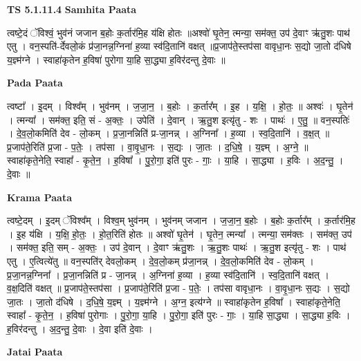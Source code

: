 \documentclass[17pt]{extarticle}
\begin{document}
\textbf{TS 5.1.11.4 } \newline
\textbf{Samhita Paata} \newline

त्वष्टे॒दं ॅविश्वं॒ भुव॑नं जजान ब॒होः क॒र्तार॑मि॒ह य॑क्षि होतः ॥अश्वो॑ घृ॒तेन॒ त्मन्या॒ सम॑क्त॒ उप॑ दे॒वाꣳ ऋ॑तु॒शः पाथ॑ एतु । वन॒स्पति॑-र्देवलो॒कं प्र॑जा॒नन्न॒ग्निना॑ ह॒व्या स्व॑दि॒तानि॑ वक्षत् ॥प्र॒जाप॑ते॒स्तप॑सा वावृधा॒नः स॒द्यो जा॒तो द॑धिषे य॒ज्ञ्म॑ग्ने । स्वाहा॑कृतेन ह॒विषा॑ पुरोगा या॒हि सा॒द्ध्या ह॒विर॑दन्तु दे॒वाः ॥ \newline

\textbf{Pada Paata} \newline

त्वष्टा᳚ । इ॒दम् । विश्व᳚म् । भुव॑नम् । ज॒जा॒न॒ । ब॒होः । क॒र्तार᳚म् । इ॒ह । य॒क्षि॒ । हो॒तः॒ ॥ अश्वः॑ । घृ॒तेन॑ । त्मन्या᳚ । सम॑क्त॒ इति॒ सं - अ॒क्तः॒ । उपेति॑ । दे॒वान् । ऋ॒तु॒श इत्यृ॑तु - शः । पाथः॑ । ए॒तु॒ ॥ वन॒स्पतिः॑ । दे॒व॒लो॒कमिति॑ देव - लो॒कम् । प्र॒जा॒नन्निति॑ प्र-जा॒नन्न् । अ॒ग्निना᳚ । ह॒व्या । स्व॒दि॒तानि॑ । व॒क्ष॒त् ॥ प्र॒जाप॑ते॒रिति॑ प्र॒जा - प॒तेः॒ । तप॑सा । वा॒वृ॒धा॒नः । स॒द्यः । जा॒तः । द॒धि॒षे॒ । य॒ज्ञ्म् । अ॒ग्ने॒ ॥ स्वाहा॑कृते॒नेति॒ स्वाहा᳚ - कृ॒ते॒न॒ । ह॒विषा᳚ । पु॒रो॒गा॒ इति॑ पुरः - गाः॒ । या॒हि । सा॒द्ध्या । ह॒विः । अ॒द॒न्तु॒ । दे॒वाः ॥  \newline


\textbf{Krama Paata} \newline

त्वष्टे॒दम् । इ॒दम् ॅविश्व᳚म् । विश्व॒म् भुव॑नम् । भुव॑नम् जजान । ज॒जा॒न॒ ब॒होः । ब॒होः क॒र्तार᳚म् । क॒र्तार॑मि॒ह । इ॒ह य॑क्षि । य॒क्षि॒ हो॒तः॒ । हो॒त॒रिति॑ होतः ॥ अश्वो॑ घृ॒तेन॑ । घृ॒तेन॒ त्मन्या᳚ । त्मन्या॒ सम॑क्तः । सम॑क्त॒ उप॑ । सम॑क्त॒ इति॒ सम् - अ॒क्तः॒ । उप॑ दे॒वान् । दे॒वाꣳ ऋ॑तु॒शः । ऋ॒तु॒शः पाथः॑ । ऋ॒तु॒श इत्यृ॑तु - शः । पाथ॑ एतु । ए॒त्वित्ये॑तु ॥ वन॒स्पति॑र् देवलो॒कम् । दे॒व॒लो॒कम् प्र॑जा॒नन्न् । दे॒व॒लो॒कमिति॑ देव - लो॒कम् । प्र॒जा॒नन्न॒ग्निना᳚ । प्र॒जा॒नन्निति॑ प्र - जा॒नन्न् । अ॒ग्निना॑ ह॒व्या । ह॒व्या स्व॑दि॒तानि॑ । स्व॒दि॒तानि॑ वक्षत् । व॒क्ष॒दिति॑ वक्षत् ॥ प्र॒जाप॑ते॒स्तप॑सा । प्र॒जाप॑ते॒रिति॑ प्र॒जा - प॒तेः॒ । तप॑सा वावृधा॒नः । वा॒वृ॒धा॒नः स॒द्यः । स॒द्यो जा॒तः । जा॒तो द॑धिषे । द॒धि॒षे॒ य॒ज्ञ्म् । य॒ज्ञ्म॑ग्ने । अ॒ग्न॒ इत्य॑ग्ने ॥ स्वाहा॑कृतेन ह॒विषा᳚ । स्वाहा॑कृते॒नेति॒ स्वाहा᳚ - कृ॒ते॒न॒ । ह॒विषा॑ पुरोगाः । पु॒रो॒गा॒ या॒हि । पु॒रो॒गा॒ इति॑ पुरः - गाः॒ । या॒हि सा॒द्ध्या । सा॒द्ध्या ह॒विः । ह॒विर॑दन्तु । अ॒द॒न्तु॒ दे॒वाः । दे॒वा इति॑ दे॒वाः । \newline

\textbf{Jatai Paata} \newline
\end{document}
